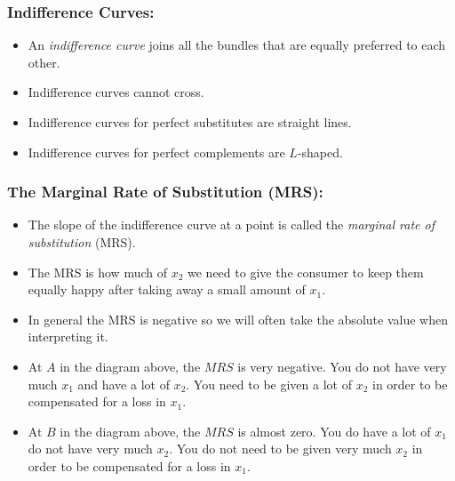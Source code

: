 \documentclass{article}
\begin{document}
\subsubsection*{Indifference Curves:}
\begin{itemize}
  \item An \emph{indifference curve} joins all the bundles that are equally preferred to each other.
  \item Indifference curves cannot cross.
  \item Indifference curves for perfect substitutes are straight lines.
  \item Indifference curves for perfect complements are $L$-shaped.
\end{itemize}
\subsubsection*{The Marginal Rate of Substitution (MRS):}
\begin{itemize}
  \item The slope of the indifference curve at a point is called the \emph{marginal rate of substitution} (MRS).
  \item The MRS is how much of $x_2$ we need to give the consumer to keep them equally happy after taking away a small amount of $x_1$.
  \item In general the MRS is negative so we will often take the absolute value when interpreting it.
\end{itemize}
\begin{center}
\end{center}
\begin{itemize}
  \item At $A$ in the diagram above, the $MRS$ is very negative. You do not have very much $x_1$ and have a lot of $x_2$. You need to be given a lot of $x_2$ in order to be compensated for a loss in $x_1$.
  \item At $B$ in the diagram above, the $MRS$ is almost zero. You do have a lot of $x_1$ do not have very much $x_2$. You do not need to be given very much $x_2$ in order to be compensated for a loss in $x_1$.
\end{itemize}
\end{document}
